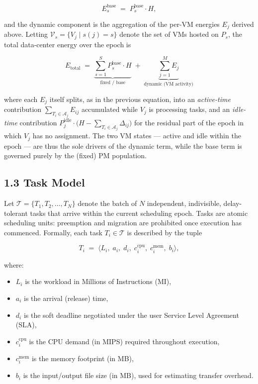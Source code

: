 \documentclass[11pt,a4paper]{article}
\begin{document}
$$
E^{\text{base}}_s \;=\; P^{\text{base}}_s \cdot H,
$$

and the dynamic component is the aggregation of the per-VM energies $E_j$ derived above. Letting $\mathcal{V}_s = \{ V_j \mid s(j) = s \}$ denote the set of VMs hosted on $P_s$, the total data-center energy over the epoch is

$$
\boxed{\; E_{\text{total}} \;=\; \underbrace{\sum_{s=1}^{S} P^{\text{base}}_s \cdot H}_{\text{fixed / base}} \;+\; \underbrace{\sum_{j=1}^{M} E_j}_{\text{dynamic (VM activity)}} \;}
$$

where each $E_j$ itself splits, as in the previous equation, into an \emph{active-time} contribution $\sum_{T_i \in \mathcal{A}_j} E_{ij}$ accumulated while $V_j$ is processing tasks, and an \emph{idle-time} contribution $P^{\text{idle}}_j \cdot \big(H - \sum_{T_i \in \mathcal{A}_j} \Delta_{ij}\big)$ for the residual part of the epoch in which $V_j$ has no assignment. The two VM states --- active and idle within the epoch --- are thus the sole drivers of the dynamic term, while the base term is governed purely by the (fixed) PM population.

\subsection*{1.3 Task Model}

Let $\mathcal{T} = \{T_1, T_2, \ldots, T_N\}$ denote the batch of $N$ independent, indivisible, delay-tolerant tasks that arrive within the current scheduling epoch. Tasks are atomic scheduling units: preemption and migration are prohibited once execution has commenced. Formally, each task $T_i \in \mathcal{T}$ is described by the tuple

$$
T_i \;=\; \big\langle L_i,\; a_i,\; d_i,\; c^{\text{cpu}}_i,\; c^{\text{mem}}_i,\; b_i \big\rangle,
$$

where:

\begin{itemize}[leftmargin=2em,itemsep=2pt]
  \item $L_i$ is the workload in Millions of Instructions (MI),
  \item $a_i$ is the arrival (release) time,
  \item $d_i$ is the soft deadline negotiated under the user Service Level Agreement (SLA),
  \item $c^{\text{cpu}}_i$ is the CPU demand (in MIPS) required throughout execution,
  \item $c^{\text{mem}}_i$ is the memory footprint (in MB),
  \item $b_i$ is the input/output file size (in MB), used for estimating transfer overhead.
\end{itemize}
\end{document}
